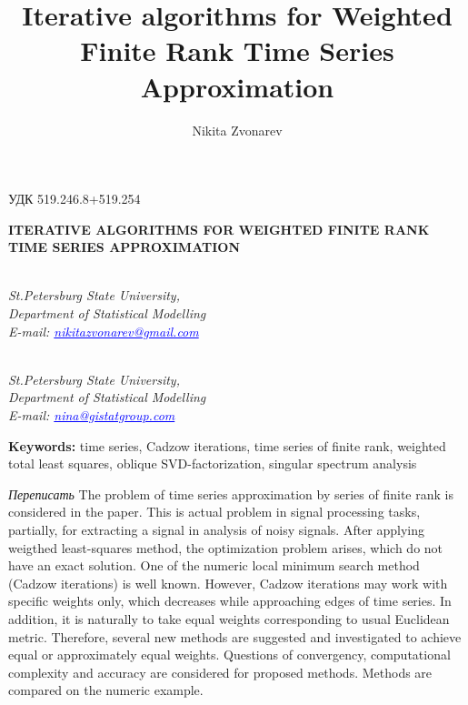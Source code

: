 \documentclass[12pt,a4paper,fleqn,leqno]{article}
\author{Nikita Zvonarev}
\title{Iterative algorithms for Weighted Finite Rank Time Series  Approximation}
\begin{document}
\noindent УДК 519.246.8+519.254

\begin{center}{
\fontsize{18pt}{23pt}\selectfont\bf%
  \MakeUppercase{
 Iterative algorithms for Weighted Finite Rank Time Series Approximation
}}
\end{center}

\begin{center}{\bpv{}\\
\footnotesize\it St.Petersburg State University,\\
Department of Statistical Modelling
\\
\rm
E-mail: \textcolor {blue}{\underline{nikitazvonarev@gmail.com}}}
\end{center}
\begin{center}{\\
\footnotesize\it St.Petersburg State University,\\
Department of Statistical Modelling
\\
\rm
E-mail: \textcolor {blue}{\underline{nina@gistatgroup.com}}}
\end{center}
\hspace{1.25cm}\begin{minipage}{12.16cm}\bpv\bpv\bmv \noindent
\footnotesize{\bf Keywords:}\/ time series, Cadzow iterations, time series of finite rank, weighted total least squares, oblique SVD-factorization, singular spectrum analysis

\bpv\bpv\noindent  \emph{Переписать} The problem of time series approximation by series of finite rank is considered in the paper. This is actual problem in signal processing tasks, partially, for extracting a signal in analysis of noisy signals. After applying weigthed least-squares method, the optimization problem arises, which do not have an exact solution. One of the numeric local minimum search method (Cadzow iterations) is well known. However, Cadzow iterations may work with specific weights only, which decreases while approaching edges of time series. In addition, it is naturally to take equal weights corresponding to usual Euclidean metric. Therefore, several new methods are suggested and investigated to achieve equal or approximately equal weights. Questions of convergency, computational complexity and accuracy are considered for proposed methods. Methods are compared on the numeric example.

\end{minipage}\bls\bmv
\end{document}
